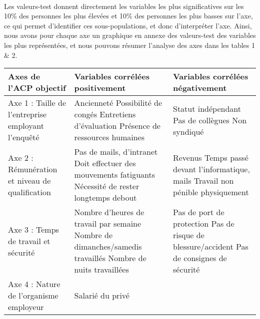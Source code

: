 \documentclass[11pt,fleqn,a4paper,openany,frenchb]{book} %
\begin{document}
\paragraph{}
Les valeurs-test donnent directement les variables les plus significatives sur les 10\% des personnes les plus élevées et 10\% des personnes les plus basses sur l'axe, ce qui permet d'identifier ces sous-populations, et donc d'interpréter l'axe. Ainsi, nous avons pour chaque axe un graphique en annexe des valeurs-test des variables les plus représentées, et nous pouvons résumer l'analyse des axes dans les tables 1 \& 2.\\ %
\begin{table}[!h]
\centering
\begin{tabular}{|p{4cm}|p{5cm}|p{5cm}|}
\hline
    Axes de l'ACP objectif & Variables corrélées positivement & Variables corrélées négativement\\ 
    \hline
    Axe 1 : Taille de l'entreprise employant l'enquêté & Ancienneté \newline Possibilité de congés \newline Entretiens d'évaluation \newline Présence de ressources humaines & Statut indépendant \newline Pas de collègues  \newline Non syndiqué \\
    \hline
    Axe 2 : Rémunération et niveau de qualification 
    & Pas de mails, d'intranet 
    \newline Doit effectuer des mouvements fatiguants 
    \newline Nécessité de rester longtemps debout 
    & Revenus 
    \newline Temps passé devant l'informatique, mails 
    \newline Travail non pénible physiquement\\
    \hline
    Axe 3 : Temps de travail et sécurité & 
    Nombre d'heures de travail par semaine 
    \newline Nombre de dimanches/samedis travaillés
    \newline Nombre de nuits travaillées
    & Pas de port de protection
    \newline Pas de risque de blessure/accident
    \newline Pas de consignes de sécurité\\
    \hline
    Axe 4 : Nature de l'organisme employeur 
    & Salarié du privé

\end{tabular}
\end{table}
\end{document}

